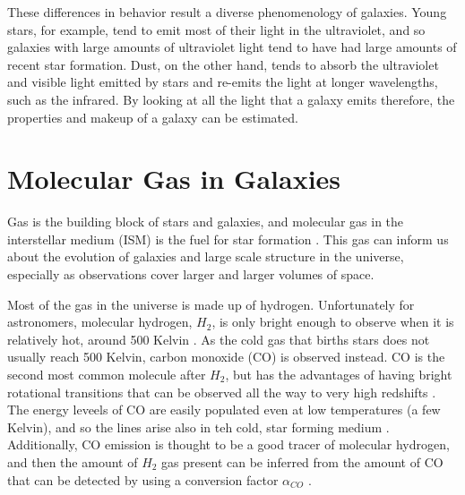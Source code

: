 \documentclass[twoside,single]{lion-msc}
\begin{document}
These differences in behavior result a diverse phenomenology of galaxies. Young stars, for example, tend to emit most of their light in the ultraviolet, and so galaxies with large amounts of ultraviolet light tend to have had large amounts of recent star formation. Dust, on the other hand, tends to absorb the ultraviolet and visible light emitted by stars and re-emits the light at longer wavelengths, such as the infrared. By looking at all the light that a galaxy emits therefore, the properties and makeup of a galaxy can be estimated.

\section{Molecular Gas in Galaxies}

Gas is the building block of stars and galaxies, and molecular gas in the interstellar medium (ISM) is the fuel for star formation \cite{decarli2019alma}. This gas can inform us about the evolution of galaxies and large scale structure in the universe, especially as observations cover larger and larger volumes of space. %


Most of the gas in the universe is made up of hydrogen. Unfortunately for astronomers, molecular hydrogen, $H_2$, is only bright enough to observe when it is relatively hot, around 500 Kelvin \cite{decarli2019alma}. As the cold gas that births stars does not usually reach 500 Kelvin, carbon monoxide (CO) is observed instead. CO is the second most common molecule after $H_2$, but has the advantages of having bright rotational transitions that can be observed all the way to very high redshifts \cite{carilli2013cool}. The energy leveels of CO are easily populated even at low temperatures (a few Kelvin), and so the lines arise also in teh cold, star forming medium \cite{carilli2013cool}. Additionally, CO emission is thought to be a good tracer of molecular hydrogen, and then the amount of $H_2$ gas present can be inferred from the amount of CO that can be detected by using a conversion factor $\alpha_{CO}$ \cite{bolatto2013co}. 
\end{document}

